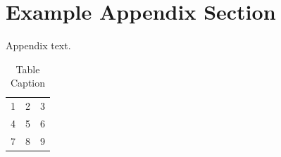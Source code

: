 \documentclass[preprint,12pt]{elsarticle}
\begin{document}
\appendix
\section{Example Appendix Section}
\label{app1}

Appendix text.


\begin{table}[t]%
\centering%
\begin{tabular}{l c r}%
  1 & 2 & 3 \\ %
  4 & 5 & 6 \\
  7 & 8 & 9 \\
\end{tabular}
\caption{Table Caption}\label{fig1}
\end{table}

 

\end{document}
